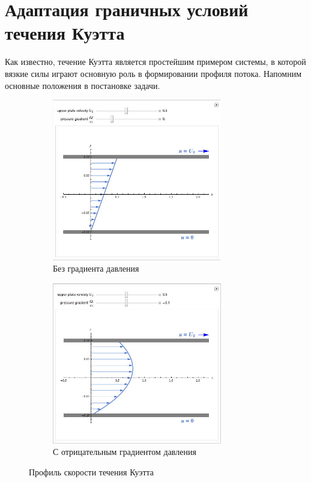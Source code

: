 \section{Адаптация граничных условий течения Куэтта} %
\label{sec:KuetteAdaptation}
	Как известно, течение Куэтта является простейшим примером системы, в которой вязкие силы играют основную роль в формировании профиля потока. Напомним основные положения в постановке задачи.

	\begin{figure}[h]
	\centering
        \begin{subfigure}[t]{0.45\textwidth}
            \includegraphics[height=200pt]{Images/KouetteFlowWithoutPressure}
            \caption{Без градиента давления}
            \label{fig:KuetteFlow:WithoutPressure}
        \end{subfigure}
        \begin{subfigure}[t]{0.45\textwidth}
            \includegraphics[height=200pt]{Images/KouetteFlowWithPressure}
            \caption{С отрицательным градиентом давления}
            \label{fig:KuetteFlow:WithPressure}
        \end{subfigure}
        \caption{Профиль скорости течения Куэтта}
        \label{fig:KuetteFlow}
	\end{figure}

